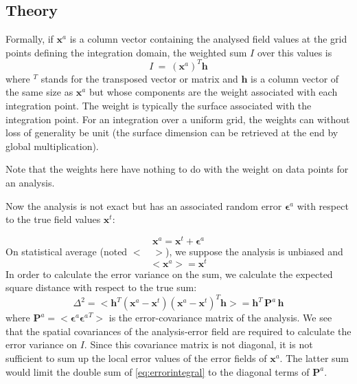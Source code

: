 \subsection{Theory}

Formally, if $\mathbf{x}^a$ is a column vector containing the analysed field values at the grid
points defining the integration domain, the weighted sum $I$ over this values is
\begin{equation}
I~=~(\mathbf{x}^a)^T \mathbf{h}
\end{equation}
where $^{T}$ stands for the transposed vector or matrix and $\mathbf{h}$ is a column vector of the same size as
$\mathbf{x}^a$ but whose components are the weight associated with each integration point. The weight is typically the surface associated with
the integration point. For an integration over a uniform grid, the weights can without loss of generality be unit (the surface dimension can be retrieved at the end by global multiplication). 

Note that the weights here have nothing to do with the weight on data points for an analysis.

Now the analysis is not exact but has an associated random error $\mathbf{\epsilon}^a$ with respect to the true
field values $\mathbf{x}^t$:

\begin{equation}
{\mathbf{x}^a} = \mathbf{x}^t + \mathbf{\epsilon}^a
\end{equation}
On statistical average (noted $< \quad >$), we suppose the analysis is unbiased and
\begin{equation}
<{\mathbf{x}^a}> = \mathbf{x}^t 
\end{equation}
In order to calculate the error variance on the sum, we calculate the expected square distance with respect to the true sum:
\begin{equation}
\Delta^2 = < \mathbf{h}^T( {\mathbf{x}^a} - \mathbf{x}^t) ({\mathbf{x}^a} - \mathbf{x}^t )^T \mathbf{h} > = \mathbf{h}^T \, \mathbf{P}^a \, \mathbf{h}
\label{eq:errorintegral}
\end{equation}
where $\mathbf{P}^a = <\mathbf{\epsilon}^a {\mathbf{\epsilon}^a}^T >$ is the error-covariance matrix of the analysis.
We see that the spatial covariances of the analysis-error field are required to calculate the error variance on $I$. Since this
covariance matrix is not diagonal, it is not sufficient to sum up the local error values of the error fields of $\mathbf{x}^a$. The latter sum would limit
the double sum of \eqref{eq:errorintegral} to the diagonal terms of $\mathbf{P}^a$.


